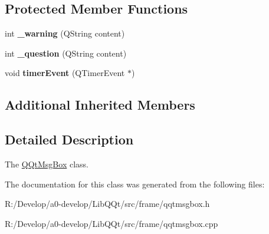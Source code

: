 \subsection*{Protected Member Functions}
\begin{DoxyCompactItemize}
\item 
\mbox{\label{class_q_qt_msg_box_a9cdbc71070dffcb3cc6387b6e0f82684}} 
int {\bfseries \+\_\+warning} (Q\+String content)
\item 
\mbox{\label{class_q_qt_msg_box_a3f218fdead0395f188434ceab2f5657e}} 
int {\bfseries \+\_\+question} (Q\+String content)
\item 
\mbox{\label{class_q_qt_msg_box_af0082c2eb8d1d8f622bbf02538b22e70}} 
void {\bfseries timer\+Event} (Q\+Timer\+Event $\ast$)
\end{DoxyCompactItemize}
\subsection*{Additional Inherited Members}


\subsection{Detailed Description}
The \mbox{\hyperlink{class_q_qt_msg_box}{Q\+Qt\+Msg\+Box}} class. 

The documentation for this class was generated from the following files\+:\begin{DoxyCompactItemize}
\item 
R\+:/\+Develop/a0-\/develop/\+Lib\+Q\+Qt/src/frame/qqtmsgbox.\+h\item 
R\+:/\+Develop/a0-\/develop/\+Lib\+Q\+Qt/src/frame/qqtmsgbox.\+cpp\end{DoxyCompactItemize}
